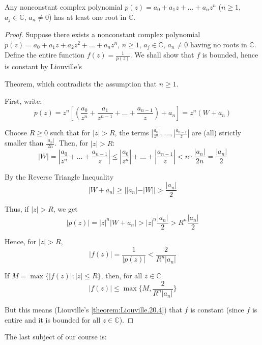 \begin{theorem}\label{theorem:Fundamental.theorem.algebra.20.5}
    Any nonconstant complex polynomial $p(z) = a_0 + a_1 z + \dots + a_n z^n$ ($n \ge 1$, $a_j \in \mathbb{C}$, $a_n \neq 0$) has at least one root in $\mathbb{C}$.
\end{theorem}
\begin{proof}
Suppose there exists a nonconstant complex polynomial $p(z) = a_0 + a_1 z + a_2 z^2 + \dots + a_n z^n$, $n \ge 1$, $a_j \in \mathbb{C}$, $a_n \neq 0$ having no roots in $\mathbb{C}$. Define the entire function $f(z) = \frac{1}{p(z)}$. We shall show that $f$ is bounded, hence is constant by Liouville's
    
    
    Theorem, which contradicts the assumption that $n \ge 1$.
    
    First, write:
    \[
        p(z) = z^n \left[ \left( \frac{a_0}{z^n} + \frac{a_1}{z^{n-1}} + \dots + \frac{a_{n-1}}{z} \right) + a_n \right] = z^n (W + a_n)
        \]
        
        Choose $R \ge 0$ such that for $|z| > R$, the terms $\left| \frac{a_0}{z^n} \right|, \dots, \left| \frac{a_{n-1}}{z} \right|$ are (all) strictly smaller than $\frac{|a_n|}{2n}$. Then, for $|z| > R$:
        \[
            |W| = \left| \frac{a_0}{z^n} + \dots + \frac{a_{n-1}}{z} \right| \le \left| \frac{a_0}{z^n} \right| + \dots + \left| \frac{a_{n-1}}{z} \right| < n \cdot \frac{|a_n|}{2n} = \frac{|a_n|}{2}
            \]
            
            By the Reverse Triangle Inequality
            \[
                |W + a_n| \ge ||a_n| - |W|| > \frac{|a_n|}{2}
                \]
                
                Thus, if $|z| > R$, we get
                \[
                    |p(z)| = |z|^n |W + a_n| > |z|^n \frac{|a_n|}{2} > R^n \frac{|a_n|}{2}
                    \]
                    
                    Hence, for $|z| > R$,
                    \[
                        |f(z)| = \frac{1}{|p(z)|} < \frac{2}{R^n |a_n|}
                        \]
                        
                        If $M = \max \{ |f(z)|: |z| \le R \}$, then, for all $z \in \mathbb{C}$
                        \[
                            |f(z)| \le \max \{ M, \frac{2}{R^n |a_n|} \}
                            \]
                            
                            But this means (Liouville's \ref{theorem:Liouville.20.4}) that $f$ is constant (since $f$ is entire and it is bounded for all $z \in \mathbb{C}$).
                            
                        \end{proof}
                            The last subject of our course is:
                            
